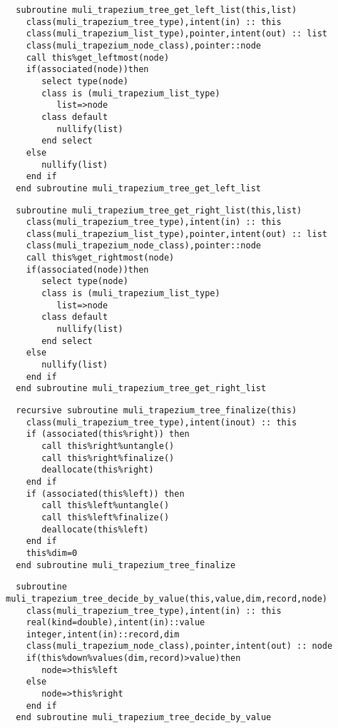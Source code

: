 \begin{Verbatim}
  subroutine muli_trapezium_tree_get_left_list(this,list)
    class(muli_trapezium_tree_type),intent(in) :: this
    class(muli_trapezium_list_type),pointer,intent(out) :: list
    class(muli_trapezium_node_class),pointer::node
    call this%get_leftmost(node)
    if(associated(node))then
       select type(node)
       class is (muli_trapezium_list_type)
          list=>node
       class default
          nullify(list)
       end select
    else
       nullify(list)
    end if
  end subroutine muli_trapezium_tree_get_left_list
\end{Verbatim}

\begin{Verbatim}
  subroutine muli_trapezium_tree_get_right_list(this,list)
    class(muli_trapezium_tree_type),intent(in) :: this
    class(muli_trapezium_list_type),pointer,intent(out) :: list
    class(muli_trapezium_node_class),pointer::node
    call this%get_rightmost(node)
    if(associated(node))then
       select type(node)
       class is (muli_trapezium_list_type)
          list=>node
       class default
          nullify(list)
       end select
    else
       nullify(list) 
    end if
  end subroutine muli_trapezium_tree_get_right_list
\end{Verbatim}

\begin{Verbatim}
  recursive subroutine muli_trapezium_tree_finalize(this)
    class(muli_trapezium_tree_type),intent(inout) :: this
    if (associated(this%right)) then
       call this%right%untangle()
       call this%right%finalize()
       deallocate(this%right)
    end if
    if (associated(this%left)) then
       call this%left%untangle()
       call this%left%finalize()
       deallocate(this%left)
    end if
    this%dim=0
  end subroutine muli_trapezium_tree_finalize
\end{Verbatim}

\begin{Verbatim}
  subroutine muli_trapezium_tree_decide_by_value(this,value,dim,record,node)
    class(muli_trapezium_tree_type),intent(in) :: this
    real(kind=double),intent(in)::value
    integer,intent(in)::record,dim
    class(muli_trapezium_node_class),pointer,intent(out) :: node
    if(this%down%values(dim,record)>value)then
       node=>this%left
    else
       node=>this%right
    end if
  end subroutine muli_trapezium_tree_decide_by_value
\end{Verbatim}

